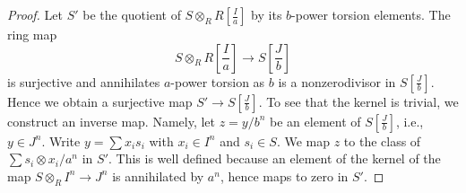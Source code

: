 \documentclass[10pt,a4paper]{amsart}
\theoremstyle{plain}
\theoremstyle{definition}
\theoremstyle{remark}
\numberwithin{equation}{subsection}
\begin{document}
\begin{proof}
Let $S'$ be the quotient of $S \otimes_R R[\frac{I}{a}]$ by its
$b$-power torsion elements. The ring map
$$
S \otimes_R R[\textstyle{\frac{I}{a}}]
\longrightarrow
S[\textstyle{\frac{J}{b}}]
$$
is surjective and annihilates $a$-power torsion as $b$ is a nonzerodivisor
in $S[\frac{J}{b}]$. Hence we obtain a surjective map $S' \to S[\frac{J}{b}]$.
To see that the kernel is trivial, we construct an inverse map. Namely, let
$z = y/b^n$ be an element of $S[\frac{J}{b}]$, i.e., $y \in J^n$.
Write $y = \sum x_is_i$ with $x_i \in I^n$ and $s_i \in S$.
We map $z$ to the class of $\sum s_i \otimes x_i/a^n$ in
$S'$. This is well defined because an element of the kernel of the map
$S \otimes_R I^n \to J^n$ is annihilated by $a^n$, hence maps to zero in $S'$.
\end{proof}
\end{document}
